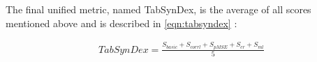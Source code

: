   \item[Similarity Score:]
  The final unified metric, named TabSynDex, is the average of all scores mentioned above and is described in \autoref{eqn:tabsyndex} \cite{chundawat2022UniversalMetricRobust}:

  \begin{equation}
    \begin{align*}
      \label{eqn:tabsyndex}
      TabSynDex = \frac{S_{basic}+S_{corrl}+S_{pMSE}+S_{cr}+S_{ml}}{5}
      \end{align*}
  \end{equation}


